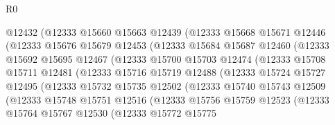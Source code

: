 \begin{lexlean}{R0}
\begin{coremodule}
                      @12432
                      (@12333
                        @15660
                        @15663
                        @12439
                        (@12333
                          @15668
                          @15671
                          @12446
                          (@12333
                            @15676
                            @15679
                            @12453
                            (@12333
                              @15684
                              @15687
                              @12460
                              (@12333
                                @15692
                                @15695
                                @12467
                                (@12333
                                  @15700
                                  @15703
                                  @12474
                                  (@12333
                                    @15708
                                    @15711
                                    @12481
                                    (@12333
                                      @15716
                                      @15719
                                      @12488
                                      (@12333
                                        @15724
                                        @15727
                                        @12495
                                        (@12333
                                          @15732
                                          @15735
                                          @12502
                                          (@12333
                                            @15740
                                            @15743
                                            @12509
                                            (@12333
                                              @15748
                                              @15751
                                              @12516
                                              (@12333
                                                @15756
                                                @15759
                                                @12523
                                                (@12333
                                                  @15764
                                                  @15767
                                                  @12530
                                                  (@12333
                                                    @15772
                                                    @15775

\end{coremodule}
\end{lexlean}
